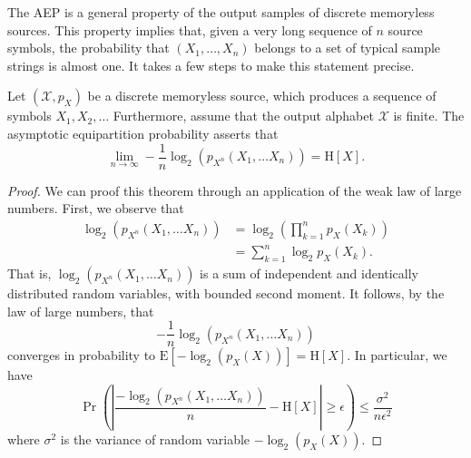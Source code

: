 The AEP is a general property of the output samples of discrete memoryless sources.
This property implies that, given a very long sequence of $n$ source symbols, the probability that $(X_1, \ldots, X_n)$ belongs to a set of typical sample strings is almost one.
It takes a few steps to make this statement precise.

\begin{theorem} \label{theorem:WeakLawEntropy}
Let $(\mathcal{X}, p_X)$ be a discrete memoryless source, which produces a sequence of symbols $X_1, X_2, \ldots $
Furthermore, assume that the output alphabet $\mathcal{X}$ is finite.
The asymptotic equipartition probability asserts that
\begin{equation*}
\lim_{n \rightarrow \infty} - \frac{1}{n} \log_2 \left( p_{X^n} (X_1, \ldots X_n) \right)
= \mathrm{H} [X] .
\end{equation*}
\end{theorem}
\begin{proof}
We can proof this theorem through an application of the weak law of large numbers.
First, we observe that
\begin{equation*}
\begin{split}
\log_2 \left( p_{X^n} (X_1, \ldots X_n) \right)
&= \log_2 \left( \prod_{k=1}^n p_{X} (X_k) \right) \\
&= \sum_{k=1}^n \log_2 p_{X} (X_k) .
\end{split}
\end{equation*}
That is, $\log_2 \left( p_{X^n} (X_1, \ldots X_n) \right)$ is a sum of independent and identically distributed random variables, with bounded second moment.
It follows, by the law of large numbers, that
\begin{equation*}
- \frac{1}{n} \log_2 \left( p_{X^n} (X_1, \ldots X_n) \right)
\end{equation*}
converges in probability to $\mathrm{E} \left[ - \log_2 (p_X(X)) \right] = \mathrm{H}[X]$.
In particular, we have
\begin{equation*}
\Pr \left(
\left| \frac{- \log_2 \left( p_{X^n} (X_1, \ldots X_n) \right)}{n} - \mathrm{H}[X] \right|
\geq \epsilon \right)
\leq \frac{ \sigma^2}{n \epsilon^2}
\end{equation*}
where $\sigma^2$ is the variance of random variable $- \log_2 (p_X(X))$.
\end{proof}


